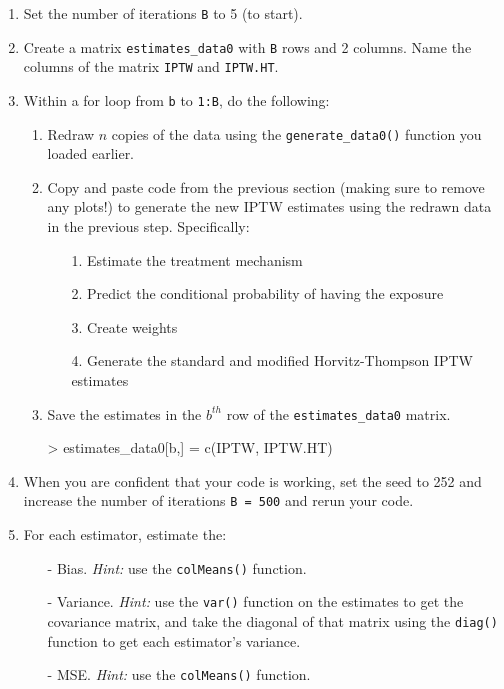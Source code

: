 \documentclass{exam}
\begin{document}
\begin{enumerate}
\begin{enumerate}
\item Set the number of iterations \texttt{B} to 5 (to start).
\item Create a matrix \texttt{estimates\_data0} with \texttt{B} rows and 2 columns. Name the columns of the matrix \texttt{IPTW} and \texttt{IPTW.HT}.
\item Within a for loop from \texttt{b} to \texttt{1:B}, do the following:
\begin{enumerate}
\item Redraw $n$ copies of the data using the \texttt{generate\_data0()} function you loaded earlier. 
\item Copy and paste code from the previous section (making sure to remove any plots!) to generate the new IPTW estimates using the redrawn data in the previous step. Specifically: 
\begin{enumerate}
\item[1.] Estimate the treatment mechanism
\item[2.] Predict the conditional probability of having the exposure
\item[3.] Create weights
\item[4.] Generate the standard and modified Horvitz-Thompson IPTW estimates
\end{enumerate}
\item Save the estimates in the $b^{th}$ row of the \texttt{estimates\_data0} matrix.
\begin{Schunk}
\begin{Sinput}
> estimates_data0[b,] = c(IPTW, IPTW.HT)
\end{Sinput}
\end{Schunk}
\end{enumerate}
\item When you are confident that your code is working, set the seed to 252 and increase the number of iterations \texttt{B = 500} and rerun your code.
\item For each estimator, estimate the:
\begin{itemize}
\item[-] Bias. \textit{Hint:} use the \texttt{colMeans()} function.
\item[-] Variance. \textit{Hint:} use the \texttt{var()} function on the estimates to get the covariance matrix, and take the diagonal of that matrix using the \texttt{diag()} function to get each estimator's variance.
\item[-] MSE. \textit{Hint:} use the \texttt{colMeans()} function.
\end{itemize}
\end{enumerate}
\end{enumerate}
\end{document}
